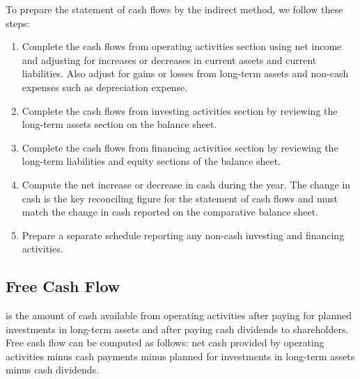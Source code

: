 \documentclass{article}
\begin{document}
To prepare the statement of cash flows by the indirect method, we follow these steps:
\begin{enumerate}
  \item Complete the cash flows from operating activities section using net income and adjusting for increases or decreases in current assets and current liabilities. Also adjust for gains or losses from long-term assets and non-cash expenses such as depreciation expense. 
  \item Complete the cash flows from investing activities section by reviewing the long-term assets section on the balance sheet. 
  \item Complete the cash flows from financing activities section by reviewing the long-term liabilities and equity sections of the balance sheet.
  \item Compute the net increase or decrease in cash during the year. The change in cash is the key reconciling figure for the statement of cash flows and must match the change in cash reported on the comparative balance sheet. 
  \item Prepare a separate schedule reporting any non-cash investing and financing activities. 
\end{enumerate}

\subsection{Free Cash Flow}

 is the amount of cash available from operating activities after paying for planned investments in long-term assets and after paying cash dividends to shareholders. Free cash flow can be computed as follows: net cash provided by operating activities minus cash payments minus planned for investments in long-term assets minus cash dividends. 
\end{document}

